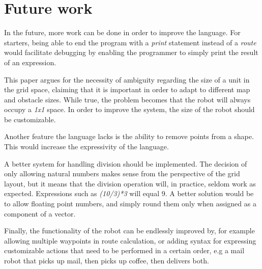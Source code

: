 
\section{Future work}

In the future, more work can be done in order to improve the language. For starters, being able to end the program with a \textit{print} statement instead of a \textit{route} would facilitate debugging by enabling the programmer to simply print the result of an expression.
\par
This paper argues for the necessity of ambiguity regarding the size of a unit in the grid space, claiming that it is important in order to adapt to different map and obstacle sizes. While true, the problem becomes that the robot will always occupy a \textit{1x1} space. In order to improve the system, the size of the robot should be customizable.
\par
Another feature the language lacks is the ability to remove points from a shape. This would increase the expressivity of the language.
\par
A better system for handling division should be implemented. The decision of only allowing natural numbers makes sense from the perspective of the grid layout, but it means that the division operation will, in practice, seldom work as expected. Expressions such as \textit{(10/3)*3} will equal 9. A better solution would be to allow floating point numbers, and simply round them only when assigned as a component of a vector.
\par
Finally, the functionality of the robot can be endlessly improved by, for example allowing multiple waypoints in route calculation, or adding syntax for expressing customizable actions that need to be performed in a certain order, e.g a mail robot that picks up mail, then picks up coffee, then delivers both.